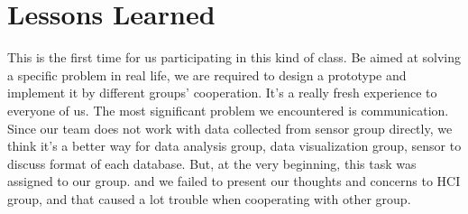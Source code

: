 \documentclass{article}
\begin{document}
\section{Lessons Learned}
This is the first time for us participating in this kind of class. Be aimed at solving a specific problem in real life, we are required to design a prototype and implement it by different groups’ cooperation. It’s a really fresh experience to everyone of us. The most significant problem we encountered is communication. Since our team does not work with data collected from sensor group directly, we think it's a better way for data analysis group, data visualization group, sensor to discuss format of each database. But, at the very beginning, this task was assigned to our group. and we failed to present our thoughts and concerns to HCI group, and that caused a lot trouble when cooperating with other group.
\end{document}
